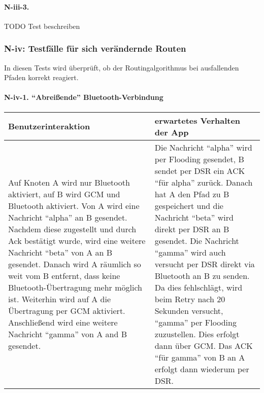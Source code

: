 \paragraph{N-iii-3.}\label{section}

TODO Test beschreiben





\clearpage
\subsubsection{N-iv: Testfälle für sich verändernde
Routen}\label{iv-testfuxe4lle-fuxfcr-sich-veruxe4ndernde-routen}

In diesen Tests wird überprüft, ob der Routingalgorithmus bei
ausfallenden Pfaden korrekt reagiert.

\paragraph{\texorpdfstring{N-iv-1. ``Abreißende''
Bluetooth-Verbindung}{N-iv-1. Abreißende Bluetooth-Verbindung}}\label{abreiuxdfende-bluetooth-verbindung}

\begin{longtable}{p{8cm}p{8.5cm}}
\toprule
Benutzerinteraktion & erwartetes Verhalten der App\tabularnewline
\midrule
\endhead
Auf Knoten A wird nur Bluetooth aktiviert, auf B wird GCM und
Bluetooth aktiviert. Von A wird eine Nachricht ``alpha'' an B gesendet.
Nachdem diese zugestellt und durch Ack bestätigt wurde, wird eine weitere
Nachricht ``beta'' von A an B gesendet. Danach wird A räumlich so weit
vom B entfernt, dass keine Bluetooth-Übertragung mehr möglich ist.
Weiterhin wird auf A die Übertragung per GCM aktiviert. Anschließend
wird eine weitere Nachricht ``gamma'' von A and B gesendet. & Die
Nachricht ``alpha'' wird per Flooding gesendet, B sendet per DSR ein ACK
``für alpha'' zurück. Danach hat A den Pfad zu B gespeichert und die
Nachricht ``beta'' wird direkt per DSR an B gesendet. Die Nachricht
``gamma'' wird auch versucht per DSR direkt via Bluetooth an B zu
senden. Da dies fehlschlägt, wird beim Retry nach 20 Sekunden versucht,
``gamma'' per Flooding zuzustellen. Dies erfolgt dann über GCM. Das ACK
``für gamma'' von B an A erfolgt dann wiederum per DSR.\tabularnewline
\bottomrule
\end{longtable}




